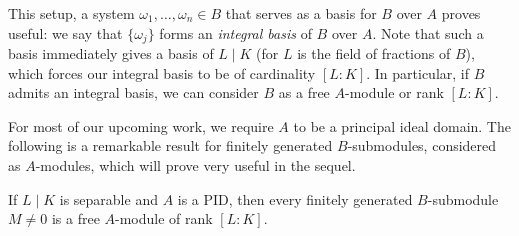 This setup, a system $\omega_1,\dots,\omega_n\in B$ that serves as a basis for $B$ over $A$ proves useful: we say that $\{\omega_j\}$ forms an \emph{integral basis} of $B$ over $A$. Note that such a basis immediately gives a basis of $L\mid K$ (for $L$ is the field of fractions of $B$), which forces our integral basis to be of cardinality $[L:K]$. In particular, if $B$ admits an integral basis, we can consider $B$ as a free $A$-module or rank $[L:K]$.

For most of our upcoming work, we require $A$ to be a principal ideal domain. The following is a remarkable result for finitely generated $B$-submodules, considered as $A$-modules, which will prove very useful in the sequel.

\begin{prop}
	If $L\mid K$ is separable and $A$ is a PID, then every finitely generated $B$-submodule $M\neq 0$ is a free $A$-module of rank $[L:K]$.
\end{prop}

